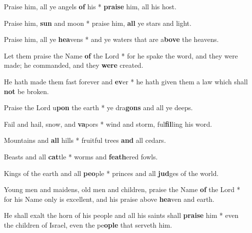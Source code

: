 \begin{multicols}{2}
	Praise him, all ye angels \textbf{of} his * \textbf{praise} him, all his host.
	
	Praise him, \textbf{sun} and moon * praise him, \textbf{all} ye stars and light.
	
	Praise him, all ye \textbf{hea}vens * and ye waters that are a\textbf{bove} the heavens.
	
	Let them praise the Name \textbf{of} the Lord * for he spake the word, and they were made; he commanded, and they \textbf{were} created.
	
	He hath made them fast forever and \textbf{ev}er * he hath given them a law which shall \textbf{not} be broken.
	
	Praise the Lord u\textbf{pon} the earth * ye dra\textbf{gons} and all ye deeps.
	
	Fail and hail, snow, and \textbf{va}pors * wind and storm, ful\textbf{fil}ling his word.
	
	Mountains and \textbf{all} hills * fruitful trees \textbf{and} all cedars.
	
	Beasts and all \textbf{cat}tle * worms and \textbf{feath}ered fowls.
	
	Kings of the earth and all \textbf{peo}ple * princes and all \textbf{jud}ges of the world.
	
	Young men and maidens, old men and children, praise the Name \textbf{of} the Lord * for his Name only is excellent, and his praise above \textbf{hea}ven and earth.
	
	He shall exalt the horn of his people and all his saints shall \textbf{praise} him * even the children of Israel, even the pe\textbf{ople} that serveth him.
\end{multicols}